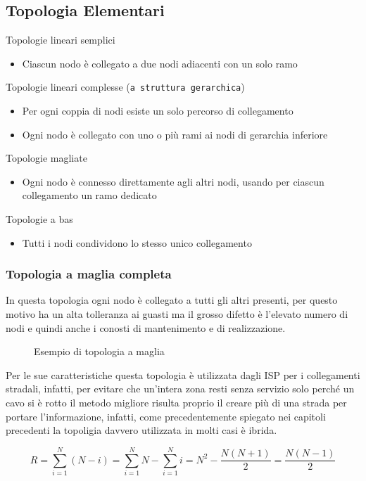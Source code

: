 \subsection{Topologia Elementari}
\label{sec:topologieelementari}
Topologie lineari semplici
\begin{itemize}
\item Ciascun nodo è collegato a due nodi adiacenti con un solo ramo
\end{itemize}
Topologie lineari complesse (\texttt{a struttura gerarchica})
\begin{itemize}
\item Per ogni coppia di nodi esiste un solo percorso di collegamento
\item Ogni nodo è collegato con uno o più rami ai nodi di gerarchia inferiore
\end{itemize}
Topologie magliate
\begin{itemize}
\item Ogni nodo è connesso direttamente agli altri nodi, usando per ciascun
  collegamento un ramo dedicato
\end{itemize}
Topologie a bas
\begin{itemize}
\item Tutti i nodi condividono lo stesso unico collegamento
\end{itemize}

\subsubsection{Topologia a maglia completa}
\label{sec:topologiaamagliacompleta}
In questa topologia ogni nodo è collegato a tutti gli altri presenti, per questo motivo
ha un alta tolleranza ai guasti ma il grosso difetto è l'elevato numero di nodi e quindi
anche i conosti di mantenimento e di realizzazione.
\begin{figure}[ht]
  \centering
  
  \caption{Esempio di topologia a maglia}
  \label{fig:topologiaamagliacompleta}
\end{figure}
\begin{oss}
  Per le sue caratteristiche questa topologia è utilizzata dagli ISP per i collegamenti
  stradali, infatti, per evitare che un'intera zona resti senza servizio solo perché
  un cavo si è rotto il metodo migliore risulta proprio il creare più di una strada
  per portare l'informazione, infatti, come precedentemente spiegato nei capitoli
  precedenti la topoligia davvero utilizzata in molti casi è ibrida.
\end{oss}
\begin{equation}
  \label{eq:magliacompleta}
  R=\sum\limits_{i=1}^N (N-i)=\sum\limits_{i=1}^N N - \sum\limits_{i=1}^N i = N^2-
  \frac{N(N+1)}{2} = \frac{N(N-1)}{2}
\end{equation}